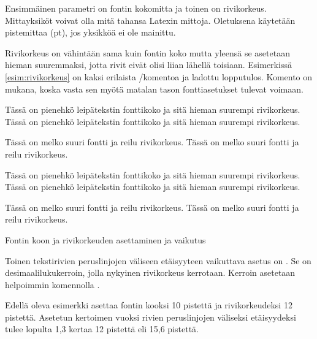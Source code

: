Ensimmäinen parametri on fontin kokomitta ja toinen on rivikorkeus.
Mitta\-yksiköt voivat olla mitä tahansa Latexin mittoja. Oletuksena
käytetään pistemittaa (pt), jos yksikköä ei ole mainittu.

Rivikorkeus on vähintään sama kuin fontin koko mutta yleensä se
asetetaan hieman suuremmaksi, jotta rivit eivät olisi liian lähellä
toisiaan. Esimerkissä \ref{esim:rivikorkeus} on kaksi erilaista
\-/komentoa ja ladottu lopputulos. Komento
 on mukana, koska vasta sen myötä matalan
tason fontti\-asetukset tulevat voimaan.

\begin{esimerkki}
\begin{koodilohko}
  \fontsize{10pt}{12pt}\selectfont Tässä on pienehkö leipätekstin
  fonttikoko ja sitä hieman suurempi rivikorkeus. Tässä on pienehkö
  leipätekstin fonttikoko ja sitä hieman suurempi rivikorkeus.

  \fontsize{16pt}{25pt}\selectfont Tässä on melko suuri fontti ja
  reilu rivikorkeus. Tässä on melko suuri fontti ja reilu
  rivikorkeus.
\end{koodilohko}
\centering
\parbox{.9\textwidth}{%
  \linespread{1}
  \fontsize{10pt}{12pt}\selectfont Tässä on pienehkö leipätekstin
  fonttikoko ja sitä hieman suurempi rivikorkeus. Tässä on
  pienehkö leipätekstin fonttikoko ja sitä hieman suurempi
  rivikorkeus.

  \fontsize{16pt}{25pt}\selectfont Tässä on melko suuri fontti ja
  reilu rivikorkeus. Tässä on melko suuri fontti ja reilu
  rivikorkeus.
}
\vspace{3ex}
\caption{Fontin koon ja rivikorkeuden asettaminen ja vaikutus}
\label{esim:rivikorkeus}
\end{esimerkki}

Toinen tekstirivien peruslinjojen väliseen etäisyyteen vaikuttava asetus
on . Se on desimaalilukukerroin, jolla
nykyinen rivikorkeus kerrotaan. Kerroin asetetaan helpoimmin komennolla
.

\begin{koodilohkosis}
  \fontsize{10pt}{12pt} \linespread{1.3} \selectfont
\end{koodilohkosis}

Edellä oleva esimerkki asettaa fontin kooksi 10 pistettä ja
rivikorkeudeksi 12 pistettä. Asetetun kertoimen vuoksi rivien
peruslinjojen väliseksi etäisyydeksi tulee lopulta 1,3 kertaa 12
pistettä eli 15,6 pistettä.

